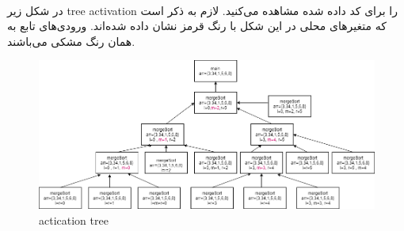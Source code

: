 
\\
در شکل زیر 
tree activation
را برای کد داده شده مشاهده می‌کنید.
لازم به ذکر است که متغیرهای محلی
در این شکل با رنگ قرمز نشان داده شده‌اند.
ورودی‌های تابع به همان رنگ مشکی می‌باشند.
\begin{figure}[htp]
    \centering
    \includegraphics[width=18cm]{q1.png}
    \caption{actication tree}
\end{figure}  